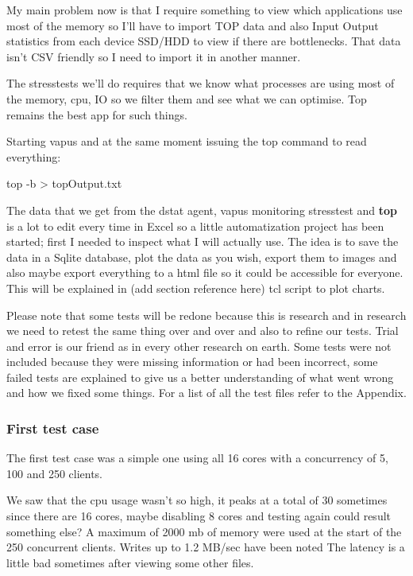 My main problem now is that I require something to view which applications use most of the memory so I'll have to import TOP data and also Input Output statistics from each device SSD/HDD to view if there are bottlenecks. That data isn't CSV friendly so I need to import it in another manner.

The stresstests we'll do requires that we know what processes are using most of the memory, \gls{cpu}, IO so we filter them and see what we can optimise. Top remains the best app for such things.

Starting \gls{vapus} and at the same moment issuing the top command to read everything:
\begin{codelisting}
top -b > topOutput.txt
\end{codelisting}
The data that we get from the dstat agent, \gls{vapus} monitoring stresstest and \textbf{top} is a lot to edit every time in Excel so a little automatization project has been started; first I needed to inspect what I will actually use. The idea is to save the data in a Sqlite database,  plot the data as you wish, export them to images 
and also maybe export everything to a \gls{html} file so it could be accessible for everyone. This will be explained in (add section reference here) \gls{tcl} script to plot charts.

Please note that some tests will be redone because this is research and in research we need to retest the same thing over and over and also to refine our tests. Trial and error is our friend as in every other research on earth. Some tests were not included because they were missing information or had been incorrect, some failed tests are explained to give us a better understanding of what went wrong and how we fixed some things. 
For a list of all the test files refer to the Appendix.

\subsubsection{First test case}
The first test case was a simple one using all 16 cores with a concurrency of 5, 100 and 250 clients.

We saw that the \gls{cpu} usage wasn't so high, it peaks at a total of 30 sometimes since there are 16 cores, maybe disabling 8 cores and testing again could result something else? A maximum of 2000 mb of memory were used at the start of the 250 concurrent clients. Writes up to 1.2 MB/sec have been noted
The latency is a little bad sometimes after viewing some other files.

